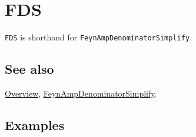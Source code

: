 \documentclass[../FeynCalcManual.tex]{subfiles}
\begin{document}
\hypertarget{fds}{
\section{FDS}\label{fds}}

\texttt{FDS} is shorthand for \texttt{FeynAmpDenominatorSimplify}.

\subsection{See also}

\hyperlink{toc}{Overview},
\hyperlink{feynampdenominatorsimplify}{FeynAmpDenominatorSimplify}.

\subsection{Examples}
\end{document}

